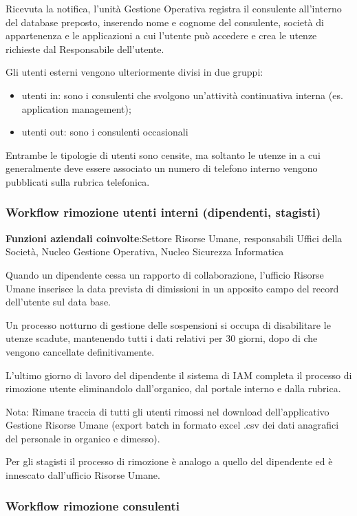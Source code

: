 Ricevuta la notifica, l'unit\`a Gestione Operativa
registra il consulente all'interno del database
preposto, inserendo nome e cognome del consulente, societ\`a di
appartenenza e le applicazioni a cui l'utente pu\`o
accedere e crea le utenze richieste dal Responsabile
dell'utente. 

Gli utenti esterni vengono ulteriormente divisi in due gruppi:

\begin{itemize}
\item utenti in: sono i consulenti che svolgono
un'attivit\`a continuativa interna (es. application
management);
\item utenti out: sono i consulenti occasionali
\end{itemize}
Entrambe le tipologie di utenti sono censite, ma soltanto le utenze in a
cui generalmente deve essere associato un numero di telefono interno
vengono pubblicati sulla rubrica telefonica.


\subsubsection{Workflow rimozione utenti interni (dipendenti, stagisti)}


\textbf{Funzioni aziendali coinvolte}:Settore
Risorse Umane, responsabili Uffici della Societ\`a,
Nucleo Gestione Operativa, Nucleo Sicurezza Informatica


Quando un dipendente cessa un rapporto di collaborazione,
l'ufficio Risorse Umane inserisce la data prevista di
dimissioni in un apposito campo del record dell'utente
sul data base. 

Un processo notturno di gestione delle sospensioni si occupa di
disabilitare le utenze scadute, mantenendo tutti i dati relativi per 30
giorni, dopo di che vengono cancellate definitivamente.

L'ultimo giorno di lavoro del dipendente il sistema di
IAM completa il processo di rimozione utente eliminandolo
dall'organico, dal portale interno e dalla rubrica.

Nota: Rimane traccia di tutti gli utenti rimossi nel download
dell'applicativo Gestione Risorse Umane (export batch
in formato excel .csv dei dati anagrafici del personale in organico e
dimesso).

Per gli stagisti il processo di rimozione \`e analogo a quello del
dipendente ed \`e innescato dall'ufficio Risorse Umane.



\subsubsection[Workflow rimozione consulenti]{Workflow rimozione consulenti}

